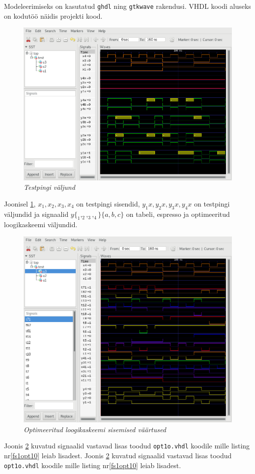Modeleerimiseks on kasutatud \verb|ghdl| ning \verb|gtkwave| rakendusi. VHDL koodi aluseks on kodutöö näidis projekti kood.

\begin{figure}[ht]
    \centering
    \includegraphics[width=1\textwidth]{figures/overview.png}
    \caption{\textit{Testpingi väljund}}
    \label{fig:wave_overview}
\end{figure}

Joonisel \ref{fig:wave_overview}, \(x_1, x_2, x_3, x_4\) on testpingi sisendid, \(y_1x, y_2x, y_3x, y_4x\) on testpingi väljundid ja signaalid \(y\{_1,_2,_3,_4\}\{a,b,c\}\) on tabeli, espresso ja optimeeritud loogikaskeemi väljundid.

\begin{figure}[ht]
    \centering
    \includegraphics[width=1\textwidth]{figures/opti1.png}
    \caption{\textit{Optimeeritud loogikaskeemi sisemised väärtused}}
    \label{fig:wave_opti1}
\end{figure}

Joonis \ref{fig:wave_opti1} kuvatud signaalid vastavad lisas toodud \verb|opt1o.vhdl| koodile mille listing nr\ref{fs1opt10} leiab lisadest. Joonis \ref{fig:wave_opti1} kuvatud signaalid vastavad lisas toodud \verb|opt1o.vhdl| koodile mille listing nr\ref{fs1opt10} leiab lisadest. 

